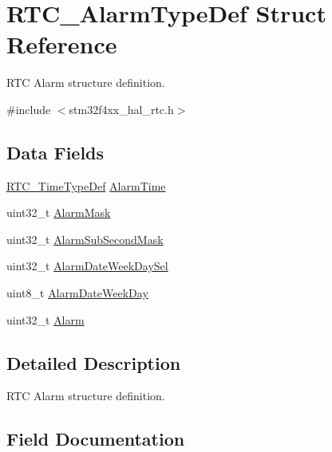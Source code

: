 \hypertarget{struct_r_t_c___alarm_type_def}{}\section{R\+T\+C\+\_\+\+Alarm\+Type\+Def Struct Reference}
\label{struct_r_t_c___alarm_type_def}


R\+TC Alarm structure definition.  




{\ttfamily \#include $<$stm32f4xx\+\_\+hal\+\_\+rtc.\+h$>$}

\subsection*{Data Fields}
\begin{DoxyCompactItemize}
\item 
\hyperlink{struct_r_t_c___time_type_def}{R\+T\+C\+\_\+\+Time\+Type\+Def} \hyperlink{struct_r_t_c___alarm_type_def_a1e50b47e1b3cb1cf09dee1b9e61028c6}{Alarm\+Time}
\item 
uint32\+\_\+t \hyperlink{struct_r_t_c___alarm_type_def_a6d5665858df4c99e589beebe7f2d120b}{Alarm\+Mask}
\item 
uint32\+\_\+t \hyperlink{struct_r_t_c___alarm_type_def_aa7f311cd270c215530acf93b454db223}{Alarm\+Sub\+Second\+Mask}
\item 
uint32\+\_\+t \hyperlink{struct_r_t_c___alarm_type_def_a366ce4c7ad04d5a29550d30d93361324}{Alarm\+Date\+Week\+Day\+Sel}
\item 
uint8\+\_\+t \hyperlink{struct_r_t_c___alarm_type_def_a0c437cb24f8b12e753e522bf0c48a4d7}{Alarm\+Date\+Week\+Day}
\item 
uint32\+\_\+t \hyperlink{struct_r_t_c___alarm_type_def_a2f11f60569f34b15c09096928f30ab24}{Alarm}
\end{DoxyCompactItemize}


\subsection{Detailed Description}
R\+TC Alarm structure definition. 

\subsection{Field Documentation}
\mbox{\label{struct_r_t_c___alarm_type_def_a2f11f60569f34b15c09096928f30ab24}} 
